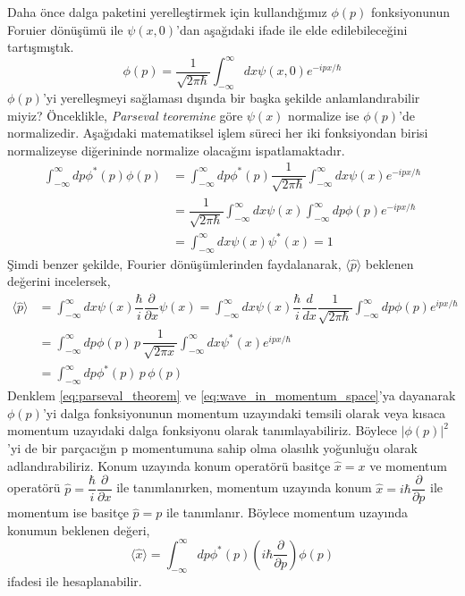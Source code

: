 \documentclass[a4paper,12pt, twoside]{article}
\begin{document}
Daha önce dalga paketini yerelleştirmek için kullandığımız $\phi(p)$ fonksiyonunun Foruier dönüşümü ile $\psi(x,0)$'dan aşağıdaki ifade ile elde edilebileceğini tartışmıştık.
\begin{equation}
\phi \left( p\right) =\dfrac {1}{\sqrt {2\pi \hbar }}\int ^{\infty }_{-\infty }dx\psi \left( x,0\right) e^{-ipx/\hbar }
\end{equation}
$\phi(p)$'yi yerelleşmeyi sağlaması dışında bir başka şekilde anlamlandırabilir miyiz? Önceklikle, \emph{Parseval teoremine} göre $\psi(x)$ normalize ise $\phi(p)$'de normalizedir. Aşağıdaki matematiksel işlem süreci her iki fonksiyondan birisi normalizeyse diğerininde normalize olacağını ispatlamaktadır.
\begin{align}
\int ^{\infty }_{-\infty }dp\phi ^{\ast }\left( p\right) \phi \left( p\right) &=\int ^{\infty }_{-\infty }dp\phi ^{\ast }\left( p\right) \dfrac {1}{\sqrt {2\pi \hbar }}\int ^{\infty }_{-\infty }dx\psi \left( x\right) e^{-ipx/\hbar }\nonumber \\
&=\dfrac {1}{\sqrt {2\pi \hbar }}\int ^{\infty }_{-\infty }dx\psi \left( x\right) \int ^{\infty }_{-\infty }dp\phi \left( p\right) e^{-ipx/\hbar }\nonumber \\
&=\int ^{\infty }_{-\infty }dx\psi \left( x\right) \psi ^{\ast }\left( x\right) = 1
\label{eq:parseval_theorem}
\end{align}
Şimdi benzer şekilde, Fourier dönüşümlerinden faydalanarak, $\langle \hat p \rangle$ beklenen değerini incelersek,
\begin{align}
\langle \hat p\rangle &=\int ^{\infty }_{-\infty }dx\psi \left( x\right) \dfrac {\hbar }{i}\dfrac {\partial}{\partial x}\psi \left( x\right) =\int ^{\infty }_{-\infty }dx\psi \left( x\right) \dfrac {\hbar }{i}\dfrac {d}{dx}\dfrac {1}{\sqrt {2\pi \hbar }}\int ^{\infty }_{-\infty }dp\phi \left( p\right) e^{ipx/\hbar }\nonumber \\
&=\int ^{\infty }_{-\infty }dp\phi \left( p\right) \,p\, \dfrac {1}{\sqrt {2\pi x}}\int ^{\infty }_{-\infty }dx\psi ^{\ast }\left( x\right) e^{ipx/\hbar }\nonumber \\
&= \int ^{\infty }_{-\infty }dp\phi ^{\ast }(p)\,p\,\phi(p)
\label{eq:wave_in_momentum_space} 
\end{align}
Denklem \ref{eq:parseval_theorem} ve \ref{eq:wave_in_momentum_space}'ya dayanarak $\phi(p)$'yi dalga fonksiyonunun momentum uzayındaki temsili olarak veya kısaca momentum uzayıdaki dalga fonksiyonu olarak tanımlayabiliriz. Böylece $|\phi(p)|^2$'yi de bir parçacığın p momentumuna sahip olma olasılık yoğunluğu olarak adlandırabiliriz. Konum uzayında konum operatörü basitçe $\hat x = x$ ve momentum operatörü $\hat p = \dfrac{\hbar}{i}\dfrac{\partial}{\partial x}$ ile tanımlanırken, momentum uzayında konum $\hat x = i \hbar\dfrac{\partial}{\partial p}$ ile momentum ise basitçe $\hat p = p$ ile tanımlanır. Böylece momentum uzayında konumun beklenen değeri,
\begin{equation}
\langle \hat x \rangle =  \int ^{\infty }_{-\infty }dp\phi ^{\ast }(p)\left(i\hbar\dfrac{\partial}{\partial p}\right)\phi(p)
\end{equation}
ifadesi ile hesaplanabilir.
\end{document}
